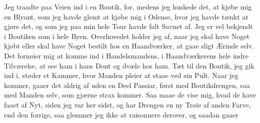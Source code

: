 \documentclass[12pt,a4paper]{book}
\begin{document}
Jeg traadte paa Veien ind i en Boutik, for, medens jeg huskede det, at
kjøbe mig en Blyant, som jeg havde glemt at kjøbe mig i Odense, hvor jeg
havde tænkt at gjøre det, og som jeg paa min hele Tour havde følt Savnet
af. Jeg er vel bekjendt i Boutiken som i hele Byen. Overhovedet holder
jeg af, naar jeg skal have Noget kjøbt eller skal have Noget bestilt hos
en Haandværker, at gaae sligt Ærinde selv. Det fornøier mig at komme ind
i Handelsmandens, i Haandværkerens hele indre Tilværelse, at see ham i
hans Dont og dvæle hos ham. Tæt til den Boutik, jeg gik ind i, støder et
Kammer, hvor Manden pleier at staae ved sin Pult. Naar jeg kommer, gaaer
det aldrig af uden en Deel Passiar, først med Boutikdrengen, saa med
Manden selv, som gjærne strax kommer. Saa maae de vise mig, hvad de have
faaet af Nyt, siden jeg var her sidst, og har Drengen en ny Trøie af
anden Farve, end den forrige, saa glemmer jeg ikke at raisonnere
derover, og saadan gaaer
\end{document}
